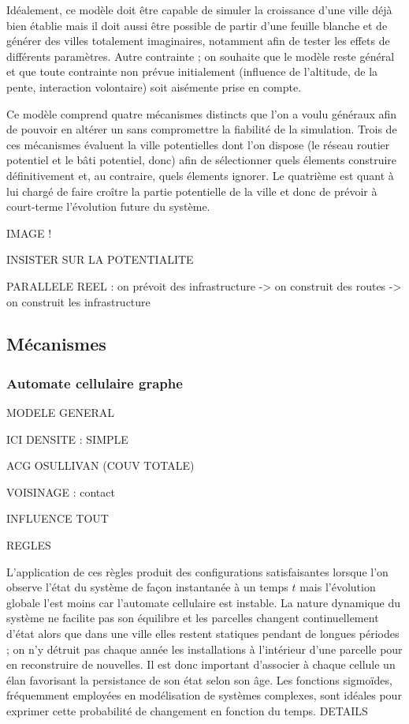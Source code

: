 \documentclass[12pt]{article}
\begin{document}
Idéalement, ce modèle doit être capable de simuler la croissance d'une
ville déjà bien établie mais il doit aussi être possible de partir
d'une feuille blanche et de générer des villes totalement imaginaires,
notamment afin de tester les effets de différents paramètres. Autre
contrainte ; on souhaite que le modèle reste général et que toute
contrainte non prévue initialement (influence de l'altitude, de la
pente, interaction volontaire) soit aisémente prise en compte.

Ce modèle comprend quatre mécanismes distincts que l'on a voulu
généraux afin de pouvoir en altérer un sans compromettre la fiabilité
de la simulation. Trois de ces mécanismes évaluent la ville
potentielles dont l'on dispose (le réseau routier potentiel et le bâti
potentiel, donc) afin de sélectionner quels élements construire
définitivement et, au contraire, quels élements ignorer. Le quatrième
est quant à lui chargé de faire croître la partie potentielle de la
ville et donc de prévoir à court-terme l'évolution future du système.

IMAGE !

INSISTER SUR LA POTENTIALITE

PARALLELE REEL : on prévoit des infrastructure -> on construit des
routes -> on construit les infrastructure

\subsection{Mécanismes}

\subsubsection{Automate cellulaire graphe}

MODELE GENERAL

ICI DENSITE : SIMPLE

ACG OSULLIVAN (COUV TOTALE)

VOISINAGE : contact

INFLUENCE TOUT

REGLES

L'application de ces règles produit des configurations satisfaisantes
lorsque l'on observe l'état du système de façon instantanée à un temps
$t$ mais l'évolution globale l'est moins car l'automate cellulaire est
instable. La nature dynamique du système ne facilite pas son équilibre
et les parcelles changent continuellement d'état alors que dans une
ville elles restent statiques pendant de longues périodes ; on n'y
détruit pas chaque année les installations à l'intérieur d'une
parcelle pour en reconstruire de nouvelles. Il est donc important
d'associer à chaque cellule un élan favorisant la persistance de son
état selon son âge. Les fonctions sigmoïdes, fréquemment employées en
modélisation de systèmes complexes, sont idéales pour exprimer cette
probabilité de changement en fonction du temps. DETAILS
\end{document}
